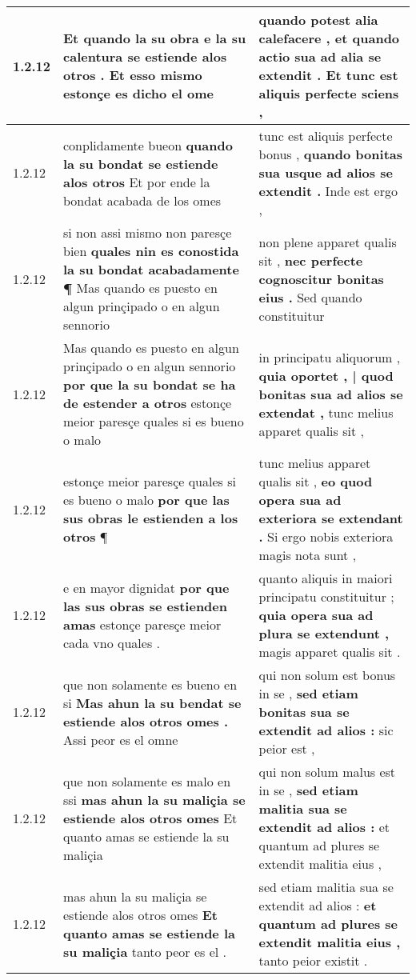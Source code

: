 \begin{tabular}{|p{1cm}|p{6.5cm}|p{6.5cm}|}
1.2.12 & Et quando la su obra \textbf{ e la su calentura se estiende alos otros . Et esso mismo } estonçe es dicho el ome & quando potest alia calefacere , \textbf{ et quando actio sua ad alia se extendit . } Et tunc est aliquis perfecte sciens , \\\hline
1.2.12 & conplidamente bueon \textbf{ quando la su bondat se estiende alos otros } Et por ende la bondat acabada de los omes & tunc est aliquis perfecte bonus , \textbf{ quando bonitas sua usque ad alios se extendit . } Inde est ergo , \\\hline
1.2.12 & si non assi mismo non paresçe bien \textbf{ quales nin es conostida la su bondat acabadamente ¶ } Mas quando es puesto en algun prinçipado o en algun sennorio & non plene apparet qualis sit , \textbf{ nec perfecte cognoscitur bonitas eius . } Sed quando constituitur \\\hline
1.2.12 & Mas quando es puesto en algun prinçipado o en algun sennorio \textbf{ por que la su bondat se ha de estender a otros } estonçe meior paresçe quales si es bueno o malo & in principatu aliquorum , \textbf{ quia oportet , | quod bonitas sua ad alios se extendat , } tunc melius apparet qualis sit , \\\hline
1.2.12 & estonçe meior paresçe quales si es bueno o malo \textbf{ por que las sus obras le estienden a los otros } ¶ & tunc melius apparet qualis sit , \textbf{ eo quod opera sua ad exteriora se extendant . } Si ergo nobis exteriora magis nota sunt , \\\hline
1.2.12 & e en mayor dignidat \textbf{ por que las sus obras se estienden amas } estonçe paresçe meior cada vno quales . & quanto aliquis in maiori principatu constituitur ; \textbf{ quia opera sua ad plura se extendunt , } magis apparet qualis sit . \\\hline
1.2.12 & que non solamente es bueno en si \textbf{ Mas ahun la su bendat se estiende alos otros omes . } Assi peor es el omne & qui non solum est bonus in se , \textbf{ sed etiam bonitas sua se extendit ad alios : } sic peior est , \\\hline
1.2.12 & que non solamente es malo en ssi \textbf{ mas ahun la su maliçia se estiende alos otros omes } Et quanto amas se estiende la su maliçia & qui non solum malus est in se , \textbf{ sed etiam malitia sua se extendit ad alios : } et quantum ad plures se extendit malitia eius , \\\hline
1.2.12 & mas ahun la su maliçia se estiende alos otros omes \textbf{ Et quanto amas se estiende la su maliçia } tanto peor es el . & sed etiam malitia sua se extendit ad alios : \textbf{ et quantum ad plures se extendit malitia eius , } tanto peior existit . \\\hline

\end{tabular}
